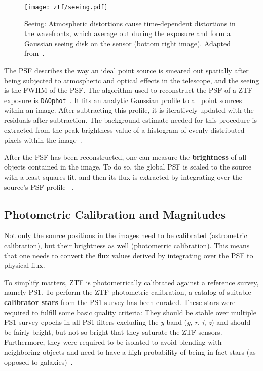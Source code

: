 \begin{figure}[h!]
    \texttt{[image: ztf/seeing.pdf]}
    \caption[Seeing]{Seeing: Atmospheric distortions cause time-dependent distortions in the wavefronts, which average out during the exposure and form a Gaussian seeing disk on the sensor (bottom right image). Adapted from~\cite{Chromey2016}.}
\end{figure}

The PSF describes the way an ideal point source is smeared out spatially after being subjected to atmospheric and optical effects in the telescope, and the seeing is the FWHM of the PSF. The algorithm used to reconstruct the PSF of a ZTF exposure is \texttt{DAOphot}~. It fits an analytic Gaussian profile to all point sources within an image. After subtracting this profile, it is iteratively updated with the residuals after subtraction. The background estimate needed for this procedure is extracted from the peak brightness value of a histogram of evenly distributed pixels within the image~\cite{Stetson1987}.

After the PSF has been reconstructed, one can measure the \textbf{brightness} of all objects contained in the image. To do so, the global PSF is scaled to the source with a least-squares fit, and then its flux is extracted by integrating over the source's PSF profile ~\cite{Stetson1987}.

\subsection{Photometric Calibration and Magnitudes}\label{magnitudes}

Not only the source positions in the images need to be calibrated (astrometric calibration), but their brightness as well (photometric calibration). This means that one needs to convert the flux values derived by integrating over the PSF to physical flux.

To simplify matters, ZTF is photometrically calibrated against a reference survey, namely PS1. To perform the ZTF photometric calibration, a catalog of suitable \textbf{calibrator stars} from the PS1 survey has been curated. These stars were required to fulfill some basic quality criteria: They should be stable over multiple PS1 survey epochs in all PS1 filters excluding the \textit{y}-band (\textit{g}, \textit{r}, \textit{i}, \textit{z}) and should be fairly bright, but not so bright that they saturate the ZTF sensors. Furthermore, they were required to be isolated to avoid blending with neighboring objects and need to have a high probability of being in fact stars (as opposed to galaxies)~\cite{Masci2019a}.

